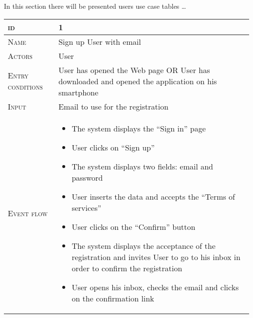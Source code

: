  In this section there will be presented users use case tables \ldots
\begin{table}[H]
    \centering
    \begin{tabular}[c]{|l|p{}|}
        \hline %
    	\textsc{id}                 &   1\\
    	\hline %
    	\textsc{Name}               &   Sign up User with email\\
    	\hline %
    	\textsc{Actors}             &   User\\
    	\hline %
    	\textsc{Entry conditions}   &   User has opened the Web page OR User has downloaded and opened the application on his smartphone\\
    	\hline %
    	\textsc{Input}   &   Email to use for the registration\\
    	\hline %
    	\textsc{Event flow}         &   \footnotesize
            	                        \begin{itemize}
                                    	    \item The system displays the “Sign in” page
                                            \item User clicks on “Sign up”
                                            \item The system displays two fields: email and password
                                            \item User inserts the data and accepts the “Terms of services”
                                            \item User clicks on the “Confirm” button
                                            \item The system displays the acceptance of the registration and invites User to go to his inbox in order to confirm the registration
                                            \item User opens his inbox, checks the email and clicks on the confirmation link


\end{itemize}
\end{tabular}
\end{table}

